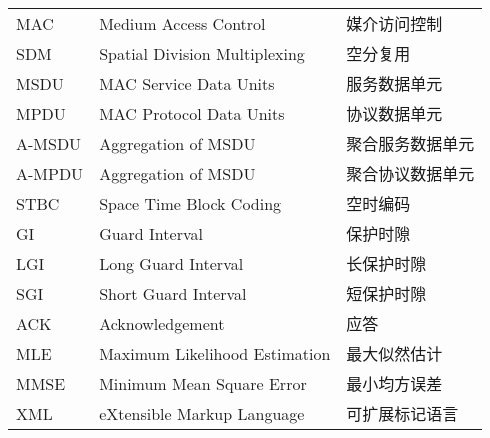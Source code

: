 \begin{supertabular}{lll}
MAC         & \hspace{0.5em}Medium Access Control                     & \hspace{0.5em}媒介访问控制 \\
SDM         & \hspace{0.5em}Spatial Division Multiplexing             & \hspace{0.5em}空分复用 \\
MSDU        & \hspace{0.5em}MAC Service Data Units                    & \hspace{0.5em}服务数据单元 \\
MPDU        & \hspace{0.5em}MAC Protocol Data Units                   & \hspace{0.5em}协议数据单元 \\
A-MSDU      & \hspace{0.5em}Aggregation of MSDU                       & \hspace{0.5em}聚合服务数据单元 \\
A-MPDU      & \hspace{0.5em}Aggregation of MSDU                       & \hspace{0.5em}聚合协议数据单元 \\
STBC        & \hspace{0.5em}Space Time Block Coding                   & \hspace{0.5em}空时编码 \\
GI          & \hspace{0.5em}Guard Interval                            & \hspace{0.5em}保护时隙 \\
LGI         & \hspace{0.5em}Long Guard Interval                       & \hspace{0.5em}长保护时隙 \\
SGI         & \hspace{0.5em}Short Guard Interval                      & \hspace{0.5em}短保护时隙 \\
ACK         & \hspace{0.5em}Acknowledgement                           & \hspace{0.5em}应答 \\
MLE         & \hspace{0.5em}Maximum Likelihood Estimation             & \hspace{0.5em}最大似然估计 \\
MMSE        & \hspace{0.5em}Minimum Mean Square Error                 & \hspace{0.5em}最小均方误差 \\
XML         & \hspace{0.5em}eXtensible Markup Language                & \hspace{0.5em}可扩展标记语言 \\
\end{supertabular}
